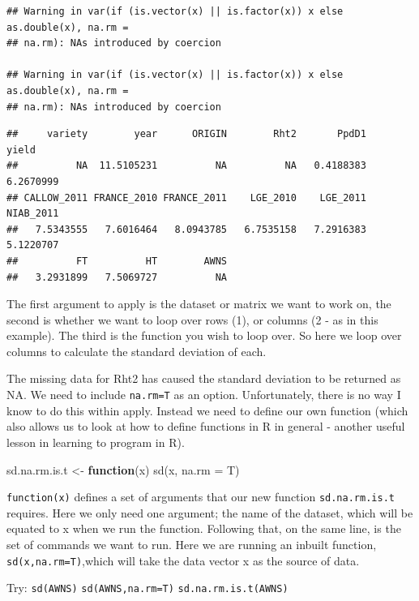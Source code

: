 \documentclass[
]{book}
\newenvironment{Shaded}{\begin{snugshade}}{\end{snugshade}}
\newcommand{\AttributeTok}[1]{\textcolor[rgb]{0.77,0.63,0.00}{#1}}
\newcommand{\ControlFlowTok}[1]{\textcolor[rgb]{0.13,0.29,0.53}{\textbf{#1}}}
\newcommand{\FunctionTok}[1]{\textcolor[rgb]{0.00,0.00,0.00}{#1}}
\newcommand{\NormalTok}[1]{#1}
\newcommand{\OtherTok}[1]{\textcolor[rgb]{0.56,0.35,0.01}{#1}}
\begin{document}
\begin{verbatim}
## Warning in var(if (is.vector(x) || is.factor(x)) x else as.double(x), na.rm =
## na.rm): NAs introduced by coercion

## Warning in var(if (is.vector(x) || is.factor(x)) x else as.double(x), na.rm =
## na.rm): NAs introduced by coercion
\end{verbatim}

\begin{verbatim}
##     variety        year      ORIGIN        Rht2       PpdD1       yield 
##          NA  11.5105231          NA          NA   0.4188383   6.2670999 
## CALLOW_2011 FRANCE_2010 FRANCE_2011    LGE_2010    LGE_2011   NIAB_2011 
##   7.5343555   7.6016464   8.0943785   6.7535158   7.2916383   5.1220707 
##          FT          HT        AWNS 
##   3.2931899   7.5069727          NA
\end{verbatim}

The first argument to apply is the dataset or matrix we want to work on, the second is whether we want to loop over rows (1), or columns (2 - as in this example). The third is the function you wish to loop over. So here we loop over columns to calculate the standard deviation of each.

The missing data for Rht2 has caused the standard deviation to be returned as NA. We need to include \texttt{na.rm=T} as an option. Unfortunately, there is no way I know to do this within apply. Instead we need to define our own function (which also allows us to look at how to define functions in R in general - another useful lesson in learning to program in R).

\begin{Shaded}
\begin{Highlighting}[]
\NormalTok{sd.na.rm.is.t }\OtherTok{\textless{}{-}} \ControlFlowTok{function}\NormalTok{(x) }\FunctionTok{sd}\NormalTok{(x, }\AttributeTok{na.rm =}\NormalTok{ T)}
\end{Highlighting}
\end{Shaded}

\texttt{function(x)} defines a set of arguments that our new function \texttt{sd.na.rm.is.t} requires. Here we only need one argument; the name of the dataset, which will be equated to x when we run the function. Following that, on the same line, is the set of commands we want to run. Here we are running an inbuilt function, \texttt{sd(x,na.rm=T)},which will take the data vector x as the source of data.

Try:
\texttt{sd(AWNS)}
\texttt{sd(AWNS,na.rm=T)}
\texttt{sd.na.rm.is.t(AWNS)}
\end{document}
